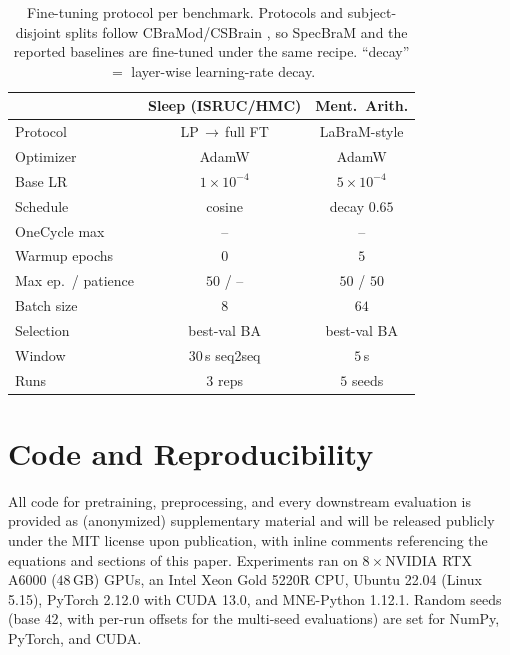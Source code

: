 \documentclass[letterpaper]{article}
\begin{document}
\begin{table}[t]\centering\scriptsize
\setlength{\tabcolsep}{3pt}
\caption{Fine-tuning protocol per benchmark. Protocols and subject-disjoint splits
follow CBraMod/CSBrain \citep{wang2025cbramod,csbrain}, so SpecBraM and the reported
baselines are fine-tuned under the same recipe. ``decay'' $=$ layer-wise
learning-rate decay.}
\label{tab:app_ft}
\begin{tabular}{lcc}
\toprule
                & Sleep (ISRUC/HMC)  & Ment.\ Arith.\\
\midrule
Protocol        & LP\,$\to$\,full FT  & LaBraM-style\\
Optimizer       & AdamW  & AdamW\\
Base LR         & $1{\times}10^{-4}$ & $5{\times}10^{-4}$\\
Schedule        & cosine  & decay $0.65$\\
OneCycle max    & -- &  --\\
Warmup epochs   & $0$  & $5$\\
Max ep.\ / patience & $50$ / -- & $50$ / $50$\\
Batch size      & $8$ & $64$\\
Selection       & best-val BA &  best-val BA\\
Window          & $30$\,s seq2seq  & $5$\,s\\
Runs            & $3$ reps & $5$ seeds\\
\bottomrule
\end{tabular}
\end{table}

\section{Code and Reproducibility}\label{app:code}
All code for pretraining, preprocessing, and every downstream evaluation is provided
as (anonymized) supplementary material and will be released publicly under the MIT
license upon publication, with inline comments referencing the equations and
sections of this paper. Experiments ran on $8\times$NVIDIA RTX A6000 ($48$\,GB) GPUs,
an Intel Xeon Gold 5220R CPU, Ubuntu 22.04 (Linux 5.15), PyTorch 2.12.0 with
CUDA 13.0, and MNE-Python 1.12.1. Random seeds (base $42$, with per-run offsets for
the multi-seed evaluations) are set for NumPy, PyTorch, and CUDA.


\end{document}
